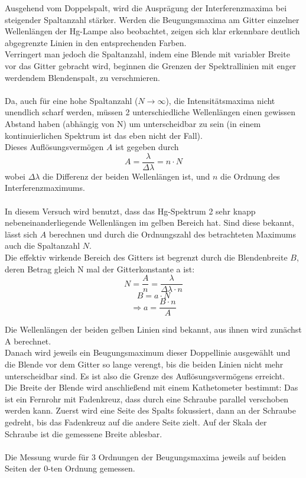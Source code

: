 \documentclass[12pt,a4paper]{article}
\begin{document}
\begin{multicols}{2}


Ausgehend vom Doppelspalt, wird die Ausprägung der Interferenzmaxima bei steigender Spaltanzahl stärker. Werden die Beugungsmaxima am Gitter einzelner Wellenlängen der Hg-Lampe also beobachtet, zeigen sich klar erkennbare deutlich abgegrenzte Linien in den entsprechenden Farben.\\
Verringert man jedoch die Spaltanzahl, indem eine Blende mit variabler Breite vor das Gitter gebracht wird, beginnen die Grenzen der Spektrallinien mit enger werdendem Blendenspalt, zu verschmieren.\\
\\
Da, auch für eine hohe Spaltanzahl ($N \rightarrow \infty $), die Intensitätsmaxima nicht unendlich scharf werden, müssen 2 unterschiedliche Wellenlängen einen gewissen Abstand haben (abhängig von N) um unterscheidbar zu sein (in einem kontinuierlichen Spektrum ist das eben nicht der Fall).\\
Dieses Auflösungsvermögen $A$ ist gegeben durch
$$A= \frac{\lambda}{\Delta \lambda} = n \cdot N$$
wobei $\Delta \lambda$ die Differenz der beiden Wellenlängen ist, und $n$ die Ordnung des Interferenzmaximums.\\
\\
In diesem Versuch wird benutzt, dass das Hg-Spektrum 2 sehr knapp nebeneinanderliegende Wellenlängen im gelben Bereich hat. Sind diese bekannt, lässt sich $A$ berechnen und durch die Ordnungszahl des betrachteten Maximums auch die Spaltanzahl $N$.\\
Die effektiv wirkende Bereich des Gitters ist begrenzt durch die Blendenbreite $B$, deren Betrag gleich N mal der Gitterkonstante a ist: 
$$N=\frac {A}{n}= \frac{\lambda}{\Delta \lambda \cdot n}$$
$$B = a \cdot N$$
$$\Rightarrow a = \frac {B \cdot n}{A}$$

Die Wellenlängen der beiden gelben Linien sind bekannt, aus ihnen wird zunächst A berechnet.\\
Danach wird jeweils ein Beugungsmaximum dieser Doppellinie ausgewählt und die Blende vor dem Gitter so lange verengt, bis die beiden Linien nicht mehr unterscheidbar sind. Es ist also die Grenze des Auflösungsvermögens erreicht.\\
Die Breite der Blende wird anschließend mit einem Kathetometer bestimmt: Das ist ein Fernrohr mit Fadenkreuz, dass durch eine Schraube parallel verschoben werden kann. Zuerst wird eine Seite des Spalts fokussiert, dann an der Schraube gedreht, bis das Fadenkreuz auf die andere Seite zielt. Auf der Skala der Schraube ist die gemessene Breite ablesbar.\\
\\
Die Messung wurde für 3 Ordnungen der Beugungsmaxima jeweils auf beiden Seiten der 0-ten Ordnung gemessen.\\





\end{multicols}
\end{document}
